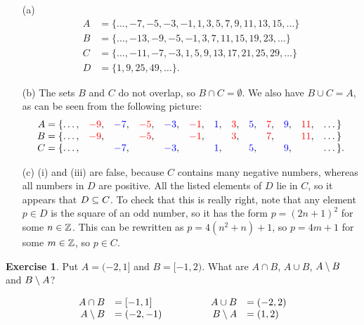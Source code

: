 \documentclass[a4paper]{book}
\theoremstyle{definition}
\newtheorem{exercise}[theorem]{Exercise}
\renewenvironment{solution}{\SolutionInline}{\endSolutionInline}
\begin{document}
\begin{solution}
 \begin{itemize}
  \item[(a)] \ghost\vspace{-3ex}
   \begin{align*}
    A &= \{ \dotsc,-7,-5,-3,-1,1,3,5,7,9,11,13,15,\dotsc \} \\
    B &= \{ \dotsc,-13,-9,-5,-1,3,7,11,15,19,23,\dotsc \} \\
    C &= \{ \dotsc,-11,-7,-3,1,5,9,13,17,21,25,29,\dotsc \} \\
    D &= \{ 1,9,25,49,\dotsc \}.
   \end{align*}
  \item[(b)] The sets $B$ and $C$ do not overlap, so
   $B\cap C=\emptyset$.  We also have $B\cup C=A$, as can be seen from
   the following picture:
   {\small \[ \begin{array}{rcccccccccccl}
       A=\{ \dotsc,& {\color{red}-9}, & {\color{blue}-7}, & {\color{red}-5}, & {\color{blue}-3},
                   & {\color{red}-1},  & {\color{blue}1},   & {\color{red}3},  & {\color{blue}5},
                   & {\color{red}7},   & {\color{blue}9},  & {\color{red}11}, & \dotsc\} \\
       B=\{ \dotsc,& {\color{red}-9}, && {\color{red}-5}, && {\color{red}-1}, && {\color{red}3},
                   && {\color{red}7}, && {\color{red}11}, & \dotsc\} \\
       C=\{ \dotsc,&& {\color{blue}-7}, && {\color{blue}-3}, && {\color{blue}1}, && {\color{blue}5},
                   && {\color{blue}9},&& \dotsc\}.
   \end{array} \]}
  \item[(c)] (i) and (iii) are false, because $C$ contains many
   negative numbers, whereas all numbers in $D$ are positive.  All the
   listed elements of $D$ lie in $C$, so it appears that $D\subseteq C$.
   To check that this is really right, note that any element $p\in D$
   is the square of an odd number, so it has the form $p=(2n+1)^2$ for
   some $n\in{\mathbb{Z}}$.  This can be rewritten as $p=4(n^2+n)+1$, so
   $p=4m+1$ for some $m\in{\mathbb{Z}}$, so $p\in C$.
 \end{itemize}
\end{solution}
\begin{exercise}
 Put $A=(-2,1]$ and $B=[-1,2)$.  What are $A\cap B$, $A\cup B$,
 $A\setminus B$ and $B\setminus A$?
\end{exercise}
\begin{solution}
 \[ \begin{array}{rlcrl}
  A\cap B &= [-1,1]  &\hspace{3em}& A\cup B &= (-2,2) \\
  A\setminus B  &= (-2,-1) && B \setminus A &=(1,2)
 \end{array} \]
\end{solution}
\end{document}
